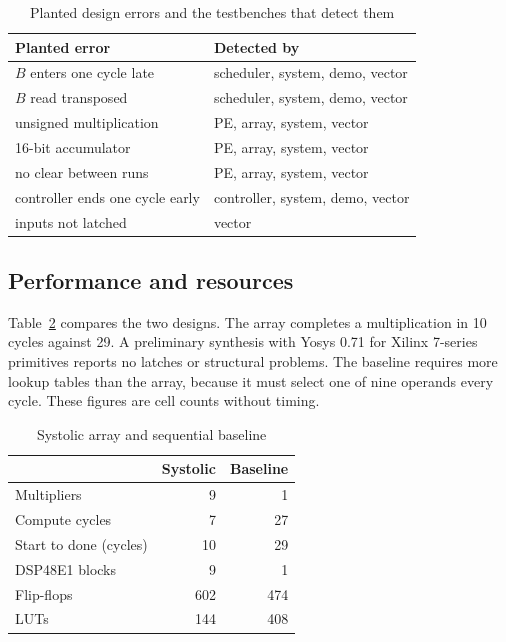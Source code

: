 \documentclass[conference]{IEEEtran}
\begin{document}
\begin{table}[t]
\caption{Planted design errors and the testbenches that detect them}
\label{tab:mut}
\centering
\begin{tabular}{@{}lp{}@{}}
\toprule
Planted error & Detected by \\
\midrule
$B$ enters one cycle late & scheduler, system, demo, vector \\
$B$ read transposed & scheduler, system, demo, vector \\
unsigned multiplication & PE, array, system, vector \\
16-bit accumulator & PE, array, system, vector \\
no clear between runs & PE, array, system, vector \\
controller ends one cycle early & controller, system, demo, vector \\
inputs not latched & vector \\
\bottomrule
\end{tabular}
\end{table}

\subsection{Performance and resources}
Table~\ref{tab:perf} compares the two designs. The array completes a multiplication in 10 cycles against 29. A preliminary synthesis with Yosys 0.71 for Xilinx 7-series primitives reports no latches or structural problems. The baseline requires more lookup tables than the array, because it must select one of nine operands every cycle. These figures are cell counts without timing.

\begin{table}[t]
\caption{Systolic array and sequential baseline}
\label{tab:perf}
\centering
\begin{tabular}{@{}lrr@{}}
\toprule
 & Systolic & Baseline \\
\midrule
Multipliers & 9 & 1 \\
Compute cycles & 7 & 27 \\
Start to done (cycles) & 10 & 29 \\
DSP48E1 blocks & 9 & 1 \\
Flip-flops & 602 & 474 \\
LUTs & 144 & 408 \\
\bottomrule
\end{tabular}
\end{table}
\end{document}
